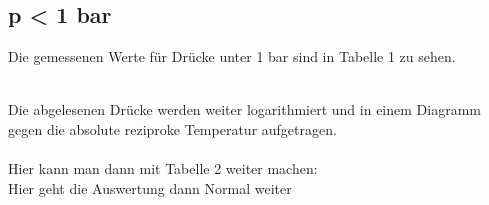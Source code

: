 \subsection{p < 1 bar}
Die gemessenen Werte für Drücke unter 1 bar sind in Tabelle 1 zu sehen.

\\
Die abgelesenen Drücke werden weiter logarithmiert und in einem Diagramm gegen
die absolute reziproke Temperatur aufgetragen. \\
 \\
\newpage
Hier kann man dann mit Tabelle 2 weiter machen:
 \\
Hier geht die Auswertung dann Normal weiter
